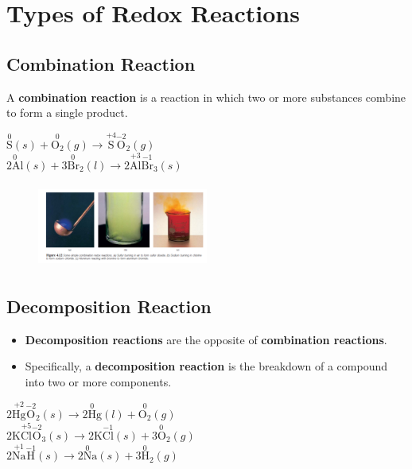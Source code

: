 \documentclass[a4paper,12pt,twocolumn]{article}
\begin{document}
\section{Types of Redox Reactions}
\subsection{Combination Reaction}
A \textbf{combination reaction} is a reaction in which two or more substances combine to form a single product. 
\begin{Box1}{}
$\stackrel{0}{\mathrm{S}}(s)+\stackrel{0}{\mathrm{O_2}}(g) \longrightarrow  {\mathrm{\stackrel{+4}{S}\stackrel{-2}{O}_2}}(g)$\\
$\stackrel{0}{2 \mathrm{Al}}(s)+\stackrel{0}{3\mathrm{Br_2}}(l) \longrightarrow  {2\mathrm{\stackrel{+3}{Al}\stackrel{-1}{Br}_3}}(s)$
\end{Box1}
\begin{figure}[h]
\centering
\includegraphics[width=0.5\textwidth, height=1.1in]{combination.png}
\end{figure}
\newpage
\subsection{Decomposition Reaction}
\begin{itemize}
\item \textbf{Decomposition reactions} are the opposite of \textbf{combination reactions}. 
\item Specifically, a \textbf{decomposition reaction} is the breakdown of a compound into two or more components. 
\end{itemize}
\begin{Box1}{}
${2\mathrm{\stackrel{+2}{Hg}\stackrel{-2}{O}_2}}(s) \longrightarrow   \stackrel{0}{2\mathrm{Hg}}(l)+\stackrel{0}{\mathrm{O_2}}(g) $\\
${2\mathrm{\stackrel{}{K}\stackrel{+5}{Cl}\stackrel{-2}{O}_3}}(s) \longrightarrow   \stackrel{}{2\mathrm{K}}\stackrel{-1}{\mathrm{Cl}}(s)+\stackrel{0}{3\mathrm{O_2}}(g) $\\
${2\mathrm{\stackrel{+1}{Na}\stackrel{-1}{H}}}(s) \longrightarrow   \stackrel{0}{2\mathrm{Na}}(s)+\stackrel{0}{3\mathrm{H_2}}(g) $
\end{Box1}
\end{document}
